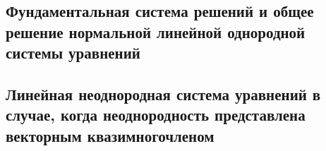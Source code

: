 


\subsection*{Фундаментальная система решений и общее решение нормальной линейной однородной
системы уравнений}

\subsection*{Линейная неоднородная система уравнений в случае, когда неоднородность представлена векторным квазимногочленом}
